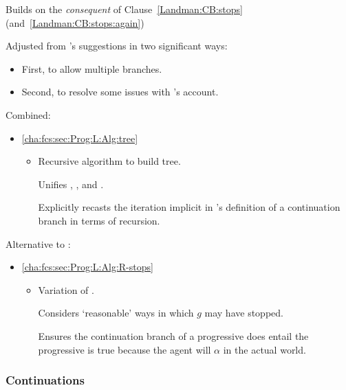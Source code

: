 \begin{note}
\begin{itemize}[noitemsep]
\begin{itemize}
      Builds on the \emph{consequent} of Clause~\ref{Landman:CB:stops} (and~\ref{Landman:CB:stops:again})

      Adjusted from \citeauthor{Landman:1992wh}'s suggestions in two significant ways:
      \begin{itemize}[noitemsep]
      \item
        First, to allow multiple branches.
      \item
        Second, to resolve some issues with \citeauthor{Landman:1992wh}'s account.
      \end{itemize}
    \end{itemize}
  \end{itemize}
  Combined:
  \begin{itemize}
  \item
    \hfill%
    \autoref{cha:fcs:sec:Prog:L:Alg:tree}
    \begin{itemize}
    \item
      Recursive algorithm to build tree.

      Unifies \AlgAC{}, \AlgGetStops{}, and \AlgFindBranches{}.

      Explicitly recasts the iteration implicit in \citeauthor{Landman:1992wh}'s definition of a continuation branch in terms of recursion.
    \end{itemize}
  \end{itemize}
  Alternative to \AlgGetStops{}:
  \begin{itemize}
  \item
    \hfill%
    \autoref{cha:fcs:sec:Prog:L:Alg:R-stops}
    \begin{itemize}
    \item
      Variation of \AlgGetStops{}.

      Considers `reasonable' ways in which \(g\) may have stopped.

      Ensures the continuation branch of a progressive does entail the progressive is true because the agent will \(\alpha\) in the actual world.
    \end{itemize}
  \end{itemize}
\end{note}

\subsubsection{Continuations}
\label{cha:fcs:sec:Prog:L:Alg:conts}

